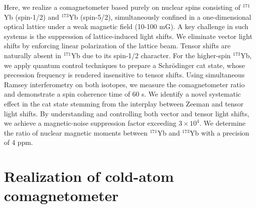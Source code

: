 \documentclass[pdflatex,sn-nature,centre]{sn-jnl}%
\begin{document}

Here, we realize a comagnetometer based purely on nuclear spins consisting of $^{171}$Yb (spin-1/2) and $^{173}$Yb (spin-5/2), simultaneously confined in a one-dimensional optical lattice under a weak magnetic field (10-100 mG). A key challenge in such systems is the suppression of lattice-induced light shifts. We eliminate vector light shifts by enforcing linear polarization of the lattice beam. Tensor shifts are naturally absent in $^{171}$Yb due to its spin-1/2 character. For the higher-spin $^{173}$Yb, we apply quantum control techniques to prepare a Schr\"{o}dinger cat state, whose precession frequency is rendered insensitive to tensor shifts. Using simultaneous Ramsey interferometry on both isotopes, we measure the comagnetometer ratio and demonstrate a spin coherence time of 60 s. We identify a novel systematic effect in the cat state stemming from the interplay between Zeeman and tensor light shifts. By understanding and controlling both vector and tensor light shifts, we achieve a magnetic-noise suppression factor exceeding $3\times10^4$. We determine the ratio of nuclear magnetic moments between $^{171}$Yb and $^{173}$Yb with a precision of 4 ppm.



\section*{Realization of cold-atom comagnetometer}
\end{document}
